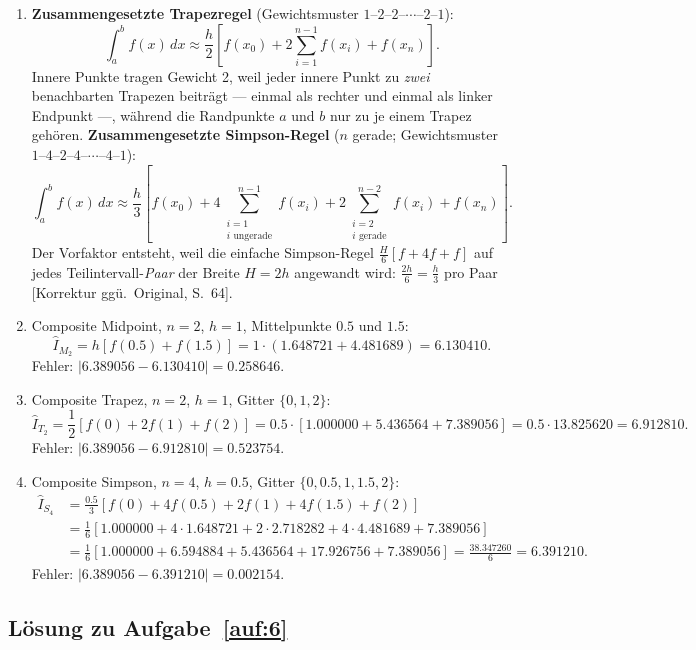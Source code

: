 \documentclass[a4paper,11pt]{scrartcl}
\begin{document}
\begin{enumerate}[label=(\alph*)]
  \item \textbf{Zusammengesetzte Trapezregel} (Gewichtsmuster $1\text{--}2\text{--}2\text{--}\cdots\text{--}2\text{--}1$):
  \[ \int_a^b f(x)\,dx \approx \frac{h}{2}\left[f(x_0) + 2\sum_{i=1}^{n-1} f(x_i) + f(x_n)\right]. \]
  Innere Punkte tragen Gewicht 2, weil jeder innere Punkt zu \emph{zwei} benachbarten Trapezen beiträgt --- einmal als rechter und einmal als linker Endpunkt ---, während die Randpunkte $a$ und $b$ nur zu je einem Trapez gehören.
  \textbf{Zusammengesetzte Simpson-Regel} ($n$ gerade; Gewichtsmuster $1\text{--}4\text{--}2\text{--}4\text{--}\cdots\text{--}4\text{--}1$):
  \[ \int_a^b f(x)\,dx \approx \frac{h}{3}\left[f(x_0) + 4\!\!\sum_{\substack{i=1\\ i\text{ ungerade}}}^{n-1}\!\! f(x_i) + 2\!\!\sum_{\substack{i=2\\ i\text{ gerade}}}^{n-2}\!\! f(x_i) + f(x_n)\right]. \]
  Der Vorfaktor entsteht, weil die einfache Simpson-Regel $\frac{H}{6}[f + 4f + f]$ auf jedes Teilintervall-\emph{Paar} der Breite $H = 2h$ angewandt wird: $\frac{2h}{6} = \frac{h}{3}$ pro Paar [Korrektur ggü.\ Original, S.~64].
  \item Composite Midpoint, $n = 2$, $h = 1$, Mittelpunkte $0.5$ und $1.5$:
  \[ \hat{I}_{M_2} = h\left[f(0.5) + f(1.5)\right] = 1 \cdot (1.648721 + 4.481689) = 6.130410. \]
  Fehler: $|6.389056 - 6.130410| = 0.258646$.
  \item Composite Trapez, $n = 2$, $h = 1$, Gitter $\{0, 1, 2\}$:
  \[ \hat{I}_{T_2} = \frac{1}{2}\left[f(0) + 2f(1) + f(2)\right] = 0.5 \cdot \left[1.000000 + 5.436564 + 7.389056\right] = 0.5 \cdot 13.825620 = 6.912810. \]
  Fehler: $|6.389056 - 6.912810| = 0.523754$.
  \item Composite Simpson, $n = 4$, $h = 0.5$, Gitter $\{0, 0.5, 1, 1.5, 2\}$:
  \begin{align*}
  \hat{I}_{S_4} &= \frac{0.5}{3}\left[f(0) + 4f(0.5) + 2f(1) + 4f(1.5) + f(2)\right] \\
  &= \frac{1}{6}\left[1.000000 + 4 \cdot 1.648721 + 2 \cdot 2.718282 + 4 \cdot 4.481689 + 7.389056\right] \\
  &= \frac{1}{6}\left[1.000000 + 6.594884 + 5.436564 + 17.926756 + 7.389056\right] = \frac{38.347260}{6} = 6.391210.
  \end{align*}
  Fehler: $|6.389056 - 6.391210| = 0.002154$.
\end{enumerate}

\subsection*{Lösung zu Aufgabe~\ref{auf:6}}
\end{document}
